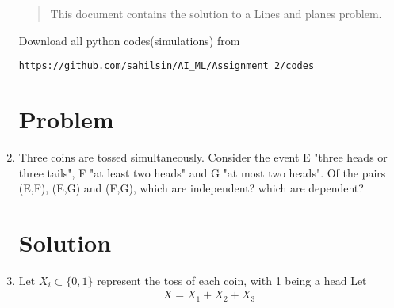 \begin{enumerate}[label=\thesection.\arabic*.,ref=\thesection.\theenumi]

\begin{abstract}
This document contains the solution to a Lines and planes problem.
\end{abstract}
Download all python codes(simulations) from 
%
\begin{lstlisting}
https://github.com/sahilsin/AI_ML/Assignment 2/codes
\end{lstlisting}

\section{Problem}

\item Three coins are tossed simultaneously. Consider the event E "three heads or three tails", F "at least two heads" and G "at most two heads". Of the pairs (E,F), (E,G) and (F,G), which are independent? which are dependent?

\section{Solution}
\item Let $X_{i} \subset  \{0,1\} $ represent the toss of each coin, with 1 being a head Let
\begin{align}
    X=X_{1}+X_{2}+X_{3}
\end{align}


\end{enumerate}
